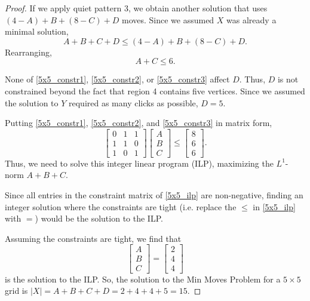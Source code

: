 \documentclass[a4paper]{article}
\newcommand{\abs}[1]{\left| #1 \right|}
\begin{document}
\begin{proof}
		If we apply quiet pattern 3, we obtain another solution that uses $(4 - A) + B + (8 - C) + D$ moves.
		Since we assumed $X$ was already a minimal solution,
		\begin{equation*}
			A + B + C + D \leq (4 - A) + B + (8 - C) + D.
		\end{equation*}
		Rearranging,
		\begin{equation}\label{5x5_constr3}
			A + C \leq 6.
		\end{equation}
	
		None of \eqref{5x5_constr1}, \eqref{5x5_constr2}, or \eqref{5x5_constr3} affect $D$.
		Thus, $D$ is not constrained beyond the fact that region 4 contains five vertices.
		Since we assumed the solution to $Y$ required as many clicks as possible, $D = 5$.
	
		Putting \eqref{5x5_constr1}, \eqref{5x5_constr2}, and \eqref{5x5_constr3} in matrix form,
		\begin{equation}\label{5x5_ilp}
			\begin{bmatrix}
				0 & 1 & 1 \\
				1 & 1 & 0 \\
				1 & 0 & 1
			\end{bmatrix}
			\begin{bmatrix}
				A \\
				B \\
				C
			\end{bmatrix}
			\leq
			\begin{bmatrix}
				8 \\
				6 \\
				6
			\end{bmatrix}.
		\end{equation}
		Thus, we need to solve this integer linear program (ILP), maximizing the $L^1$-norm $A + B + C$.
		
		Since all entries in the constraint matrix of \eqref{5x5_ilp} are non-negative, finding an integer solution where the constraints are tight (i.e. replace the $\leq$ in \eqref{5x5_ilp} with $=$) would be the solution to the ILP.
		
		Assuming the constraints are tight, we find that
		\begin{equation*}
			\begin{bmatrix}
				A \\
				B \\
				C
			\end{bmatrix}
			=
			\begin{bmatrix}
				2 \\
				4 \\
				4
			\end{bmatrix}
		\end{equation*}
		is the solution to the ILP.
		So, the solution to the Min Moves Problem for a $5 \times 5$ grid is $\abs{X} = A + B + C + D = 2 + 4 + 4 + 5 = 15$.
	\end{proof}
\end{document}
